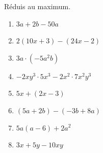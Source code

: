 %
%
    Réduis au maximum.
    \begin{enumerate}[cols=2]
        \item $3a + 2b - 50a$
        \item $2(10x+3) - (24x-2)$
        \item $3a \cdot (-5a^2b)$
        \item $-2xy^3 \cdot 5x^3 - 2x^2 \cdot 7x^2y^3$
        \item $5x+(2x-3)$
        \item $(5a+2b)-(-3b+8a)$
        \item $5a(a-6) + 2a^2$
        \item $3x+5y-10xy$
    \end{enumerate}
